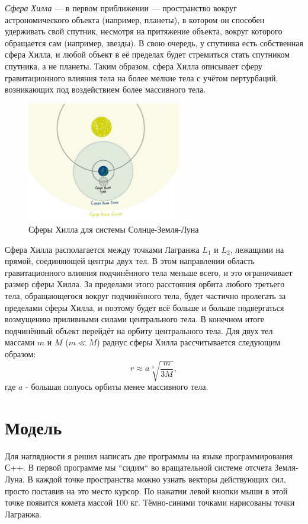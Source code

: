 \documentclass[a4paper,12pt]{article}
\begin{document}
\textit{Сфера Хилла} — в первом приближении — пространство вокруг астрономического объекта (например, планеты), в котором он способен удерживать свой спутник,
несмотря на притяжение объекта, вокруг которого обращается сам (например, звезды).
В свою очередь, у спутника есть собственная сфера Хилла, и любой объект в её пределах будет стремиться стать спутником спутника, а не планеты.
Таким образом, сфера Хилла описывает сферу гравитационного влияния тела на более мелкие тела с учётом пертурбаций, возникающих под воздействием более массивного тела.
\begin{figure}[H]
    \begin{center}
	\includegraphics[width=0.6\textwidth]{Hill.jpg}
	\caption{Сферы Хилла для системы Солнце-Земля-Луна}
    \end{center}
\end{figure}
Сфера Хилла располагается между точками Лагранжа $L_1$ и $L_2$, лежащими на прямой, соединяющей центры двух тел.
В этом направлении область гравитационного влияния подчинённого тела меньше всего, и это ограничивает размер сферы Хилла.
За пределами этого расстояния орбита любого третьего тела, обращающегося вокруг подчинённого тела, будет частично пролегать за пределами сферы Хилла,
и поэтому будет всё больше и больше подвергаться возмущению приливными силами центрального тела.
В конечном итоге подчинённый объект перейдёт на орбиту центрального тела.
Для двух тел массами $m$ и $M$ ($m \ll M$) радиус сферы Хилла рассчитывается следующим образом:
$$ r \approx a \sqrt[3]{\frac{m}{3M}}, $$ где $a$ - большая полуось орбиты менее массивного тела.

\section{Модель}

Для наглядности я решил написать две программы на языке программирования С++. В первой программе мы ``сидим`` во вращательной системе отсчета Земля-Луна.
В каждой точке пространства можно узнать векторы действующих сил, просто поставив на это место курсор.
По нажатии левой кнопки мыши в этой точке появится комета массой 100 кг. Тёмно-синими точками нарисованы точки Лагранжа.   
\end{document}
